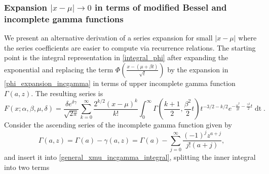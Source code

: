 \documentclass[10pt,a4paper,oneside]{article}
\numberwithin{equation}{section}
\begin{document}

\subsubsection{Expansion $|x-\mu| \to 0$ in terms of modified Bessel and incomplete gamma functions}
We present an alternative derivation of a series expansion for small $|x-\mu|$ where the series coefficients are easier to compute via recurrence relations. The starting point is the integral representation in \eqref{integral_phi} after expanding the exponential
and replacing the term $\Phi\left(\frac{x - (\mu +\beta t)}{\sqrt{t}}\right)$ by the expansion in \eqref{phi_expansion_incgamma} in terms of upper incomplete gamma function $\Gamma(a, z)$. The resulting series is
\begin{equation}\label{general_xmu_incgamma_integral}
F(x;\alpha, \beta, \mu, \delta) = \frac{\delta e^{\delta \gamma}}{\sqrt{2\pi}} \sum_{k=0}^{\infty}\frac{2^{k/2}(x-\mu)^k}{k!}\int_0^{\infty}\Gamma\left(\frac{k+1}{2}, \frac{\beta^2}{2}t\right) t^{-3/2-k/2} e^{-\frac{\omega^2}{2t} - \frac{\gamma^2}{2}t} \mathop{dt}.
\end{equation}
Consider the ascending series of the incomplete gamma function given by \cite[\S 8.7]{NIST:DLMF}
\begin{equation}
\Gamma(a, z) = \Gamma(a) - \gamma(a, z) = \Gamma(a) - \sum_{j=0}^{\infty} \frac{(-1)^j z^{a+j}}{j! (a+ j)},
\end{equation}
and insert it into \eqref{general_xmu_incgamma_integral}, splitting the inner integral into two terms
\end{document}
